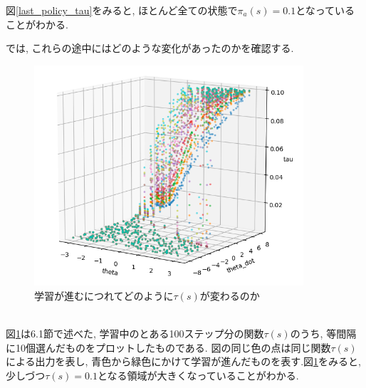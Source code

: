 \documentclass{jsarticle}
\begin{document}
図\ref{last_policy_tau}をみると, ほとんど全ての状態で$\pi_a(s)=0.1$となっていることがわかる.\par
では, これらの途中にはどのような変化があったのかを確認する. 
\begin{figure}[h]
	\centering
 	\includegraphics[width=10cm]{tau_dependency_of_state.png}
 	\caption{学習が進むにつれてどのように$\tau(s)$が変わるのか} \label{on_the_way}
\end{figure}\\
図\ref{on_the_way}は6.1節で述べた, 学習中のとある100ステップ分の関数$\tau(s)$のうち, 等間隔に10個選んだものをプロットしたものである. 図の同じ色の点は同じ関数$\tau(s)$による出力を表し, 青色から緑色にかけて学習が進んだものを表す.図\ref{on_the_way}をみると, 少しづつ$\tau(s)=0.1$となる領域が大きくなっていることがわかる. \par
\end{document}
